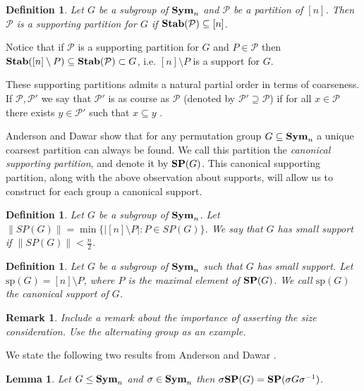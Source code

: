 \documentclass[12pt]{report}
\newtheorem{remark}[thm]{Remark} \newtheorem{definition}[thm]{Definition}
\newtheorem{lem}[thm]{Lemma} \newtheorem{prop}[thm]{Proposition}
\newcommand{\stab}{\text{\textbf{Stab}}}
\newcommand{\sym}{\text{\textbf{Sym}}}
\newcommand{\SP}{\text{\textbf{SP}}}
\newcommand{\consp}{\text{sp}}
\begin{document}
\begin{definition}
  Let $G$ be a subgroup of $\sym_n$ and $\mathcal{P}$ be a partition of $[n]$.
  Then $\mathcal{P}$ is a \emph{supporting partition} for $G$ if
  $\stab(\mathcal{P}) \subseteq [n]$.
\end{definition}

Notice that if $\mathcal{P}$ is a supporting partition for $G$ and $P \in
\mathcal{P}$ then $\stab([n] \setminus P) \subseteq \stab(\mathcal{P}) \subset
G$, i.e. $[n] \setminus P$ is a support for $G$.

These supporting partitions admits a natural partial order in terms of
coarseness. If $\mathcal{P}, \mathcal{P}'$ we say that $\mathcal{P}'$ is as
course as $\mathcal{P}$ (denoted by $\mathcal{P}' \supseteq \mathcal{P}$) if for
all $x \in \mathcal{P}$ there exists $y \in \mathcal{P}'$ such that $x \subseteq
y$ \cite{AndersonD17}.

Anderson and Dawar \cite{AndersonD17} show that for any permutation group $G
\subseteq \sym_n$ a unique coarsest partition can always be found. We call this
partition the \emph{canonical supporting partition}, and denote it by $\SP (G)$.
This canonical supporting partition, along with the above observation about
supports, will allow us to construct for each group a canonical support.

\begin{definition}
  Let $G$ be a subgroup of $\sym_n$. Let $\| SP(G) \| = \min \{\vert [n]
  \setminus P \vert : P \in SP(G) \}$. We say that $G$ has small support if $\|
  SP(G) \| < \frac{n}{2}$.
\end{definition}

\begin{definition}
  Let $G$ be a subgroup of $\sym_n$ such that $G$ has small support. Let
  $\consp(G) = [n] \setminus P$, where $P$ is the maximal element of $\SP(G)$.
  We call $\consp(G)$ the canonical support of $G$.
\end{definition}

\begin{remark}
  Include a remark about the importance of asserting the size consideration. Use
  the alternating group as an example.
\end{remark}

We state the following two results from Anderson and Dawar \cite{AndersonD17}.

\begin{lem}
  \label{lem:SP_conjugation}
  Let $G \leq \sym_n$ and $\sigma \in \sym_n$ then $\sigma \SP (G) = \SP(\sigma
  G \sigma^{-1})$.
\end{lem}
\end{document}
